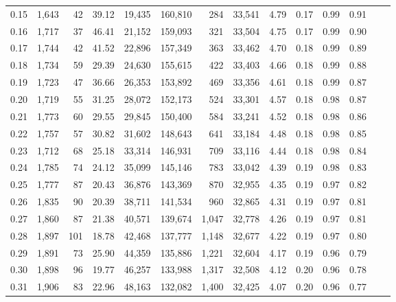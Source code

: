 \begin{tabular}{rrrrrrrrrrrrrr}
0.15 &  1,643 &     42 &   39.12 &   19,435 &  160,810 &     284 &  33,541 &  4.79 &  0.17 &  0.99 &      0.91 \\
0.16 &  1,717 &     37 &   46.41 &   21,152 &  159,093 &     321 &  33,504 &  4.75 &  0.17 &  0.99 &      0.90 \\
0.17 &  1,744 &     42 &   41.52 &   22,896 &  157,349 &     363 &  33,462 &  4.70 &  0.18 &  0.99 &      0.89 \\
0.18 &  1,734 &     59 &   29.39 &   24,630 &  155,615 &     422 &  33,403 &  4.66 &  0.18 &  0.99 &      0.88 \\
0.19 &  1,723 &     47 &   36.66 &   26,353 &  153,892 &     469 &  33,356 &  4.61 &  0.18 &  0.99 &      0.87 \\
0.20 &  1,719 &     55 &   31.25 &   28,072 &  152,173 &     524 &  33,301 &  4.57 &  0.18 &  0.98 &      0.87 \\
0.21 &  1,773 &     60 &   29.55 &   29,845 &  150,400 &     584 &  33,241 &  4.52 &  0.18 &  0.98 &      0.86 \\
0.22 &  1,757 &     57 &   30.82 &   31,602 &  148,643 &     641 &  33,184 &  4.48 &  0.18 &  0.98 &      0.85 \\
0.23 &  1,712 &     68 &   25.18 &   33,314 &  146,931 &     709 &  33,116 &  4.44 &  0.18 &  0.98 &      0.84 \\
0.24 &  1,785 &     74 &   24.12 &   35,099 &  145,146 &     783 &  33,042 &  4.39 &  0.19 &  0.98 &      0.83 \\
0.25 &  1,777 &     87 &   20.43 &   36,876 &  143,369 &     870 &  32,955 &  4.35 &  0.19 &  0.97 &      0.82 \\
0.26 &  1,835 &     90 &   20.39 &   38,711 &  141,534 &     960 &  32,865 &  4.31 &  0.19 &  0.97 &      0.81 \\
0.27 &  1,860 &     87 &   21.38 &   40,571 &  139,674 &   1,047 &  32,778 &  4.26 &  0.19 &  0.97 &      0.81 \\
0.28 &  1,897 &    101 &   18.78 &   42,468 &  137,777 &   1,148 &  32,677 &  4.22 &  0.19 &  0.97 &      0.80 \\
0.29 &  1,891 &     73 &   25.90 &   44,359 &  135,886 &   1,221 &  32,604 &  4.17 &  0.19 &  0.96 &      0.79 \\
0.30 &  1,898 &     96 &   19.77 &   46,257 &  133,988 &   1,317 &  32,508 &  4.12 &  0.20 &  0.96 &      0.78 \\
0.31 &  1,906 &     83 &   22.96 &   48,163 &  132,082 &   1,400 &  32,425 &  4.07 &  0.20 &  0.96 &      0.77 \\

\end{tabular}
